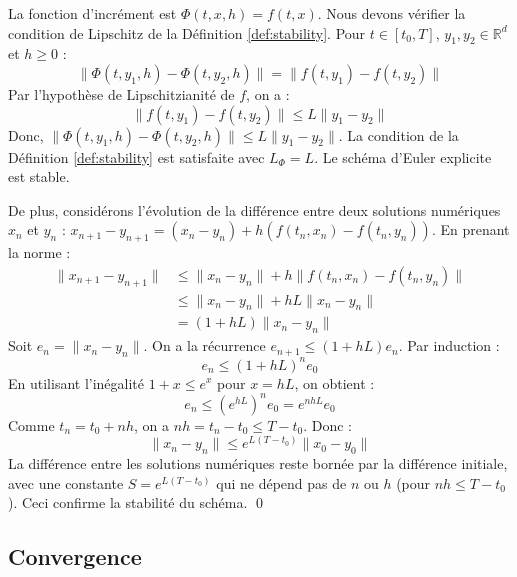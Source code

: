 \documentclass{article}
\newenvironment{proof}[1][Preuve]{\begin{trivlist}
\item[\hskip \labelsep {\bfseries #1}]}{\qed\end{trivlist}}
\begin{document}
\begin{proof}
La fonction d'incrément est $\Phi(t, x, h) = f(t, x)$.
Nous devons vérifier la condition de Lipschitz de la Définition \ref{def:stability}. Pour $t \in [t_0, T]$, $y_1, y_2 \in \mathbb{R}^d$ et $h \ge 0$ :
\begin{equation*}
 \|\Phi(t, y_1, h) - \Phi(t, y_2, h)\| = \|f(t, y_1) - f(t, y_2)\|
\end{equation*}
Par l'hypothèse de Lipschitzianité de $f$, on a :
\begin{equation*}
 \|f(t, y_1) - f(t, y_2)\| \le L \|y_1 - y_2\|
\end{equation*}
Donc, $\|\Phi(t, y_1, h) - \Phi(t, y_2, h)\| \le L \|y_1 - y_2\|$. La condition de la Définition \ref{def:stability} est satisfaite avec $L_\Phi = L$. Le schéma d'Euler explicite est stable.

De plus, considérons l'évolution de la différence entre deux solutions numériques $x_n$ et $y_n$ :
$x_{n+1} - y_{n+1} = (x_n - y_n) + h (f(t_n, x_n) - f(t_n, y_n))$.
En prenant la norme :
\begin{align*} \|x_{n+1} - y_{n+1}\| &\le \|x_n - y_n\| + h \|f(t_n, x_n) - f(t_n, y_n)\| \\ &\le \|x_n - y_n\| + h L \|x_n - y_n\| \\ &= (1 + hL) \|x_n - y_n\| \end{align*}
Soit $e_n = \|x_n - y_n\|$. On a la récurrence $e_{n+1} \le (1 + hL) e_n$. Par induction :
\begin{equation*}
e_n \le (1 + hL)^n e_0
\end{equation*}
En utilisant l'inégalité $1+x \le e^x$ pour $x = hL$, on obtient :
\begin{equation*}
e_n \le (e^{hL})^n e_0 = e^{nhL} e_0
\end{equation*}
Comme $t_n = t_0 + nh$, on a $nh = t_n - t_0 \le T - t_0$. Donc :
\begin{equation*}
\|x_n - y_n\| \le e^{L(T-t_0)} \|x_0 - y_0\|
\end{equation*}
La différence entre les solutions numériques reste bornée par la différence initiale, avec une constante $S = e^{L(T-t_0)}$ qui ne dépend pas de $n$ ou $h$ (pour $nh \le T-t_0$). Ceci confirme la stabilité du schéma.
\end{proof}

\subsection{Convergence}
\end{document}
